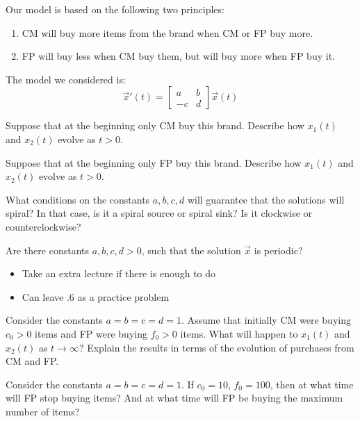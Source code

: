 	Our model is based on the following two principles:
	\begin{enumerate}[label={($P_{\arabic*}$)}]
		\item CM will buy more items from the brand when CM or FP buy more.
		\item FP will buy less when CM buy them, but will buy more when FP buy it.
	\end{enumerate}

	The model we considered is:
	$$
	\vec{x}'(t) = 
	\begin{bmatrix}
 		a & b \\
 		-c & d
	\end{bmatrix}
	\vec{x}(t)
	$$
	
	\begin{parts}
		\item Suppose that at the beginning only CM buy this brand. Describe how $x_1(t)$ and $x_2(t)$ evolve as $t>0$.


		\item Suppose that at the beginning only FP buy this brand. Describe how $x_1(t)$ and $x_2(t)$ evolve as $t>0$.


		\item What conditions on the constants $a,b,c,d$ will guarantee that the solutions will spiral? In that case, is it a spiral source or spiral sink? Is it clockwise or counterclockwise?
		\item Are there constants $a,b,c,d>0$, such that the solution $\vec{x}$ is periodic?
\begin{annotation}
	\begin{goals}
		\begin{itemize}
			\item Take an extra lecture if there is enough to do
			\item Can leave .6 as a practice problem
		\end{itemize}
	\end{goals}
\end{annotation}
		\item Consider the constants $a=b=c=d=1$. Assume that initially CM were buying $c_0>0$ items and FP were buying $f_0>0$ items.
			What will happen to $x_1(t)$ and $x_2(t)$ as $t \to \infty$? Explain the results in terms of the evolution of purchases from CM and FP.
		\item Consider the constants $a=b=c=d=1$.  If $c_0=10$, $f_0=100$, then at what time will FP stop buying items? And at what time will FP be buying the maximum number of items?
	
	\end{parts}



\begin{notslides}

\bookonlynewpage


\hfill

\bookonlynewpage
\standardonlynewpage
\end{notslides}
